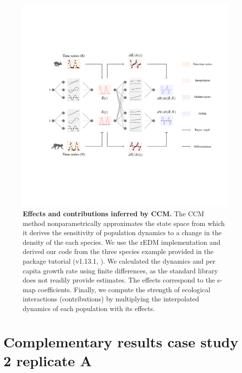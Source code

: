 \documentclass[11pt, oneside]{article}
\begin{document}
\begin{figure}[H]
\includegraphics[width=1\linewidth,page=13]{figures/main.pdf}
\caption{
    \textbf{Effects and contributions inferred by CCM.}
    The CCM method nonparametrically approximates the state space from which it derives the sensitivity of population dynamics to a change in the density of the each species.
    We use the rEDM implementation and derived our code from the three species example provided in the package tutorial (v1.13.1, \cite{Sugihara2012}).
    We calculated the dynamics and per capita growth rate using finite differences, as the standard library does not readily provide estimates.
    The effects correspond to the s-map coefficients.
    Finally, we compute the strength of ecological interactions (contributions) by multiplying the interpolated dynamics of each population with its effects.
}
\end{figure}
\newpage


\newpage
\section{Complementary results case study 2 replicate A}
\end{document}
